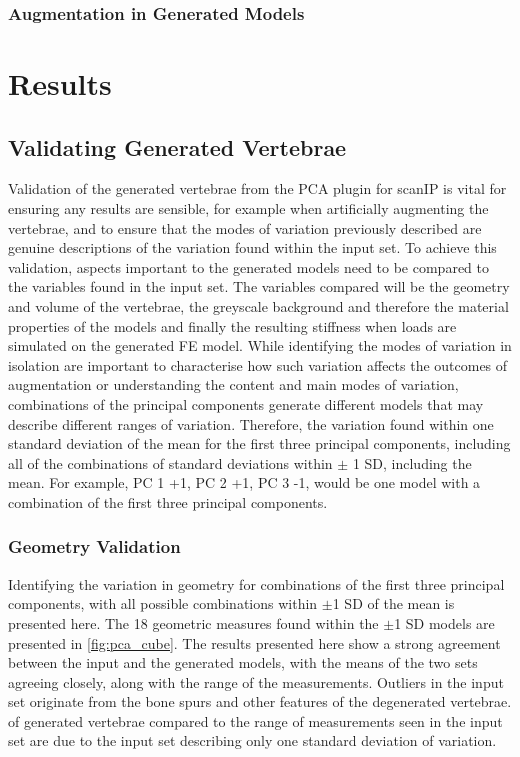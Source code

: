 \subsubsection{Augmentation in Generated Models}




\section{Results}

\subsection{Validating Generated Vertebrae} \label{sec:pca_val}

Validation of the generated vertebrae from the PCA plugin for scanIP is vital
for ensuring any results are sensible, for example when artificially augmenting
the vertebrae, and to ensure that the modes of variation previously described
are genuine descriptions of the variation found within the input set.  To
achieve this validation, aspects important to the generated models need to be
compared to the variables found in the input set.  The variables compared will
be the geometry and volume of the vertebrae, the greyscale background and
therefore the material properties of the models and finally the resulting
stiffness when loads are simulated on the generated FE model.  While
identifying the modes of variation in isolation are important to characterise
how such variation affects the outcomes of augmentation or understanding the
content and main modes of variation, combinations of the principal components
generate different models that may describe different ranges of variation.
Therefore, the variation found within one standard deviation of the mean for
the first three principal components, including all of the combinations of
standard deviations within $\pm$ 1 SD, including the mean.  For example, PC 1
+1, PC 2 +1, PC 3 -1, would be one model with a combination of the first three
principal components.

\subsubsection{Geometry Validation}

Identifying the variation in geometry for combinations of the first three
principal components, with all possible combinations within $\pm$1 SD of the
mean is presented here.  The 18 geometric measures found within the $\pm$1 SD
models are presented in \cref{fig:pca_cube}.  The results presented here show a
strong agreement between the input and the generated models, with the means of
the two sets agreeing closely, along with the range of the measurements.
Outliers in the input set originate from the bone spurs and other features of
the degenerated vertebrae. %
of generated vertebrae compared to the range of measurements seen in the input
set are due to the input set describing only one standard deviation of
variation.

